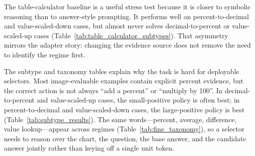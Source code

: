 \begin{table}[h]
\centering
\small
\resizebox{\linewidth}{!}{}
\caption{DePlot-style table-extraction plus calculator baseline by subtype on ScaleQA-Natural. The method is strong for some regimes but fails on the opposite direction, again showing that scale correction is regime-dependent.}
\label{tab:table_calculator_subtypes}
\end{table}

The table-calculator baseline is a useful stress test because it is closer to symbolic reasoning than to answer-style prompting. It performs well on percent-to-decimal and value-scaled-down cases, but almost never solves decimal-to-percent or value-scaled-up cases (Table~\ref{tab:table_calculator_subtypes}). That asymmetry mirrors the adapter story: changing the evidence source does not remove the need to identify the regime first.

\begin{table}[h]
\centering
\small
\resizebox{\linewidth}{!}{}
\caption{Learned policy routing with question/base-answer numeric features and optional chart-side context extracted from the image. Values are 50-seed means.}
\label{tab:chart_context_router}
\end{table}

\begin{table}[h]
\centering
\small
\resizebox{\linewidth}{!}{}
\caption{External numeric PlotQA-500 check.}
\label{tab:plotqa_external}
\end{table}

\begin{table}[h]
\centering
\small
\resizebox{\linewidth}{!}{}
\caption{External numeric checks with InternVL2.5-8B.}
\label{tab:external_internvl8b}
\end{table}

\begin{table}[h]
\centering
\small
\resizebox{\linewidth}{!}{}
\caption{ScaleQA-Natural subtype analysis on the 403-example reviewed set.}
\label{tab:subtype_results}
\end{table}

The subtype and taxonomy tables explain why the task is hard for deployable selectors. Most image-evaluable examples contain explicit percent evidence, but the correct action is not always ``add a percent'' or ``multiply by 100''. In decimal-to-percent and value-scaled-up cases, the small-positive policy is often best; in percent-to-decimal and value-scaled-down cases, the large-positive policy is best (Table~\ref{tab:subtype_results}). The same words---percent, average, difference, value lookup---appear across regimes (Table~\ref{tab:fine_taxonomy}), so a selector needs to reason over the chart, the question, the base answer, and the candidate answer jointly rather than keying off a single unit token.


